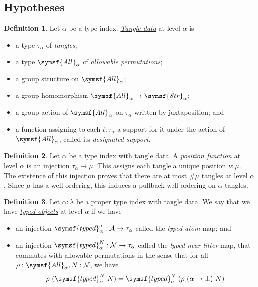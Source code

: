 \documentclass{article}
\newcommand{\cdef}[3]{\href{https://leanprover-community.github.io/con-nf/doc/ConNF/#1.html\#ConNF.#2}{\emph{#3}}}
\theoremstyle{definition}
\newtheorem{definition}{Definition}[section]
\theoremstyle{remark}
\begin{document}
\subsection{Hypotheses}

\begin{definition}
    Let \( \alpha \) be a type index.
    \cdef{Fuzz/Hypotheses}{TangleData}{Tangle data} at level \( \alpha \) is
    \begin{itemize}
        \item a type \( \tau_\alpha \) of \emph{tangles};
        \item a type \( \symsf{All}_\alpha \) of \emph{allowable permutations};
        \item a group structure on \( \symsf{All}_\alpha \);
        \item a group homomorphism \( \symsf{All}_\alpha \to \symsf{Str}_\alpha \);
        \item a group action of \( \symsf{All}_\alpha \) on \( \tau_\alpha \) written by juxtaposition; and
        \item a function assigning to each \( t : \tau_\alpha \) a support for it under the action of \( \symsf{All}_\alpha \), called its \emph{designated support}.
    \end{itemize}
\end{definition}
\begin{definition}
    Let \( \alpha \) be a type index with tangle data.
    A \cdef{Fuzz/Hypotheses}{PositionFunction}{position function} at level \( \alpha \) is an injection \( \tau_\alpha \to \mu \).
    This assigns each tangle a unique position \( \nu : \mu \).
    The existence of this injection proves that there are at most \( \#\mu \) tangles at level \( \alpha \).
    Since \( \mu \) has a well-ordering, this induces a pullback well-ordering on \( \alpha \)-tangles.
\end{definition}
\begin{definition}
    Let \( \alpha : \lambda \) be a proper type index with tangle data.
    We say that we have \cdef{Fuzz/Hypotheses}{TypedObjects}{typed objects} at level \( \alpha \) if we have
    \begin{itemize}
        \item an injection \( \symsf{typed}^a_\alpha : \mathcal A \to \tau_\alpha \) called the \emph{typed atom} map; and
        \item an injection \( \symsf{typed}^N_\alpha : \mathcal N \to \tau_\alpha \) called the \emph{typed near-litter} map, that commutes with allowable permutations in the sense that for all \( \rho : \symsf{All}_\alpha, N : \mathcal N \), we have
        \[ \rho\ (\symsf{typed}^N_\alpha\ N) = \symsf{typed}^N_\alpha\ (\rho\ (\alpha \to \bot)\ N) \]
    \end{itemize}
\end{definition}
\end{document}
